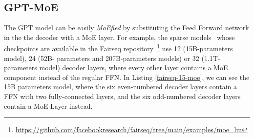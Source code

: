 \subsection{GPT-MoE}\label{gpt-moe}
The GPT model can be easily \textit{MoEfied} by substituting the Feed Forward network in the the decoder with a MoE layer. For example, the sparse models~\cite{fairseq-checkpoint} whose checkpoints are available in the Fairseq repository~\footnote{\url{https://github.com/facebookresearch/fairseq/tree/main/examples/moe_lm}} use 12 (15B-parameters model), 24 (52B- parameters and 207B-parameters models) or 32 (1.1T-parameters model) decoder layers, where every other layer contains a MoE component instead of the regular FFN. In Listing \ref{fairseq-15-moe}, we can see the 15B parameters model, where the six even-numbered decoder layers contain a FFN with two fully-connected layers, and the six odd-numbered decoder layers contain a MoE Layer instead.

